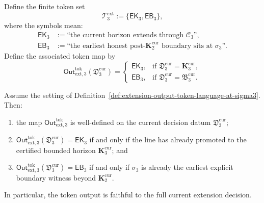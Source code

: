 \begin{definition}
\label{def:extension-output-token-language-at-sigma3}
Define the finite token set
\[
 \mathcal T^{\mathrm{ext}}_3:=\{\mathsf{EK}_3,\mathsf{EB}_3\},
\]
where the symbols mean:
\begin{align*}
 \mathsf{EK}_3 &:= \text{``the current horizon extends through }\mathcal C_3\text{''},\\
 \mathsf{EB}_3 &:= \text{``the earliest honest post-}\mathbf K_2^{\mathrm{cur}}\text{ boundary sits at }\sigma_3\text{''}.
\end{align*}
Define the associated token map by
\[
 \mathsf{Out}^{\mathrm{tok}}_{\mathrm{ext},3}(\mathfrak D_3^{\mathrm{cur}})=
 \begin{cases}
 \mathsf{EK}_3, & \text{if }\mathfrak D_3^{\mathrm{cur}}=\mathbf K_3^{\mathrm{cur}},\\[2mm]
 \mathsf{EB}_3, & \text{if }\mathfrak D_3^{\mathrm{cur}}=\mathfrak B_3^{\mathrm{cur}}.
 \end{cases}
\]
\end{definition}

\begin{proposition}
\label{prop:first-extension-decision-beyond-k2cur-admits-faithful-token-output}
Assume the setting of Definition~\ref{def:extension-output-token-language-at-sigma3}. Then:
\begin{enumerate}[label=(\roman*)]
 \item the map \(\mathsf{Out}^{\mathrm{tok}}_{\mathrm{ext},3}\) is well-defined on the current decision datum \(\mathfrak D_3^{\mathrm{cur}}\);
 \item \(\mathsf{Out}^{\mathrm{tok}}_{\mathrm{ext},3}(\mathfrak D_3^{\mathrm{cur}})=\mathsf{EK}_3\) if and only if the line has already promoted to the certified bounded horizon \(\mathbf K_3^{\mathrm{cur}}\); and
 \item \(\mathsf{Out}^{\mathrm{tok}}_{\mathrm{ext},3}(\mathfrak D_3^{\mathrm{cur}})=\mathsf{EB}_3\) if and only if \(\sigma_3\) is already the earliest explicit boundary witness beyond \(\mathbf K_2^{\mathrm{cur}}\).
\end{enumerate}
In particular, the token output is faithful to the full current extension decision.
\end{proposition}

